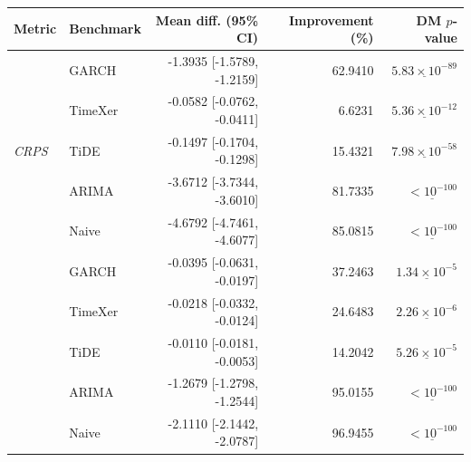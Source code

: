 \begin{tabular}{llrrr}
\toprule
Metric & Benchmark & Mean diff. (95\% CI) & Improvement (\%) & DM $p$-value \\
\midrule
\multirow{5}{*}{\textit{CRPS}}
 & GARCH & -1.3935 [-1.5789, -1.2159] & 62.9410 & $\underline{5.83 \times 10^{-89}}$ \\
 & TimeXer & -0.0582 [-0.0762, -0.0411] & 6.6231 & $\underline{5.36 \times 10^{-12}}$ \\
 & TiDE & -0.1497 [-0.1704, -0.1298] & 15.4321 & $\underline{7.98 \times 10^{-58}}$ \\
 & ARIMA & -3.6712 [-3.7344, -3.6010] & 81.7335 & $\underline{< 10^{-100}}$ \\
 & Naive & -4.6792 [-4.7461, -4.6077] & 85.0815 & $\underline{< 10^{-100}}$ \\
\addlinespace \midrule
\multirow{5}{*}{\textit{twCRPS}}
 & GARCH & -0.0395 [-0.0631, -0.0197] & 37.2463 & $\underline{1.34 \times 10^{-5}}$ \\
 & TimeXer & -0.0218 [-0.0332, -0.0124] & 24.6483 & $\underline{2.26 \times 10^{-6}}$ \\
 & TiDE & -0.0110 [-0.0181, -0.0053] & 14.2042 & $\underline{5.26 \times 10^{-5}}$ \\
 & ARIMA & -1.2679 [-1.2798, -1.2544] & 95.0155 & $\underline{< 10^{-100}}$ \\
 & Naive & -2.1110 [-2.1442, -2.0787] & 96.9455 & $\underline{< 10^{-100}}$ \\
\bottomrule
\end{tabular}